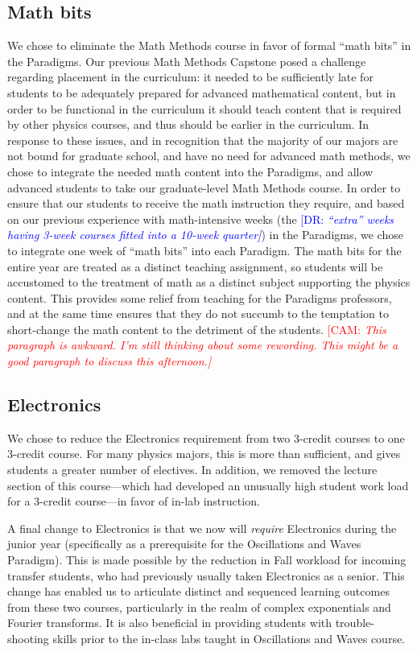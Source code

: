 \documentclass[english,aps,pra,reprint,noshowpacs,superscriptaddress]{revtex4-1}
\newcommand\corinnesays[1]{\textcolor{red}{[\sc CAM: \em{#1}]}}
\newcommand\davidsays[1]{\textcolor{blue}{[\sc DR: \em{#1}]}}
\begin{document}
\subsection{Math bits}
We chose to eliminate the Math Methods course in favor of formal
``math bits'' in the Paradigms.  Our previous Math Methods Capstone
posed a challenge regarding placement in the curriculum: it needed to
be sufficiently late for students to be adequately prepared
for advanced mathematical content, but in order to be functional in
the curriculum it should teach content that is required by other
physics courses, and thus should be earlier in the curriculum.  In
response to these issues, and in recognition that the majority of our
majors are not bound for graduate school, and have no need for
advanced math methods, we chose to integrate the needed math content
into the Paradigms, and allow advanced students to take our
graduate-level Math Methods course.  In order to ensure that our
students to receive the math instruction they require, and based on
our previous experience with math-intensive weeks (the \davidsays{``extra''
weeks having 3-week courses fitted into a 10-week quarter})
in the Paradigms, we chose to integrate one week of ``math bits'' into
each Paradigm.  The math bits for the entire year are treated as a
distinct teaching assignment, so students will be accustomed to the
treatment of math as a distinct subject supporting the physics
content.  This provides some relief from teaching for the Paradigms
professors, and at the same time ensures that they do not succumb to
the temptation to short-change the math content to the detriment of
the students.
\corinnesays{This paragraph is awkward.  I'm still thinking about some rewording.  This might be a good paragraph to discuss this afternoon.}

\subsection{Electronics}
We chose to reduce the Electronics requirement from two 3-credit
courses to one 3-credit course.  For many physics majors, this is more
than sufficient, and gives students a greater number of electives.  In
addition, we removed the lecture section of this course---which had
developed an unusually high student work load for a 3-credit
course---in favor of in-lab instruction.

A final change to Electronics is that we now will \emph{require}
Electronics during the junior year (specifically as a prerequisite for
the Oscillations and Waves Paradigm).  This is made possible by the reduction in
Fall workload for incoming transfer students, who had previously
usually taken Electronics as a senior.  This change has enabled us to
articulate distinct and sequenced learning outcomes from these two
courses, particularly in the realm of complex exponentials and Fourier
transforms.  It is also beneficial in providing students with
trouble-shooting skills prior to the in-class labs taught in
Oscillations and Waves course.
\end{document}
